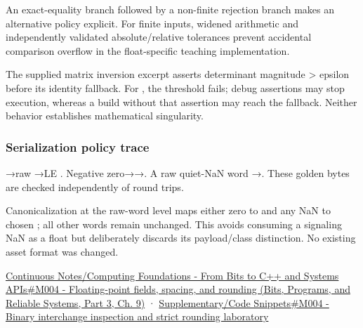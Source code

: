 An exact-equality branch followed by a non-finite rejection branch makes an alternative policy explicit. For finite inputs, widened arithmetic and independently validated absolute/relative tolerances prevent accidental comparison overflow in the float-specific teaching implementation.

The supplied matrix inversion excerpt asserts determinant magnitude \textgreater{} epsilon before its identity fallback. For , the threshold fails; debug assertions may stop execution, whereas a build without that assertion may reach the fallback. Neither behavior establishes mathematical singularity.

\subsubsection{Serialization policy trace}\label{appendix-92ff77d4dfdc-serialization-policy-trace}

\hypertarget{appendix-92ff77d4dfdc-serialization-policy-trace}{}

→raw →LE . Negative zero→→. A raw quiet-NaN word →. These golden bytes are checked independently of round trips.

Canonicalization at the raw-word level maps either zero to  and any NaN to chosen ; all other words remain unchanged. This avoids consuming a signaling NaN as a float but deliberately discards its payload/class distinction. No existing asset format was changed.

\href{../01-Bits-Programs-and-Reliable-Systems-P03/main.pdf\#01-foundations-i-ch011-m004---floating-point-fields-spacing-and-rounding}{Continuous Notes/Computing Foundations - From Bits to C++ and Systems APIs\#M004 - Floating-point fields, spacing, and rounding (Bits, Programs, and Reliable Systems, Part 3, Ch. 9)} · \hyperref[appendix-4e2236f53445-m004---binary-interchange-inspection-and-strict-rounding-laboratory]{Supplementary/Code Snippets\#M004 - Binary interchange inspection and strict rounding laboratory}


